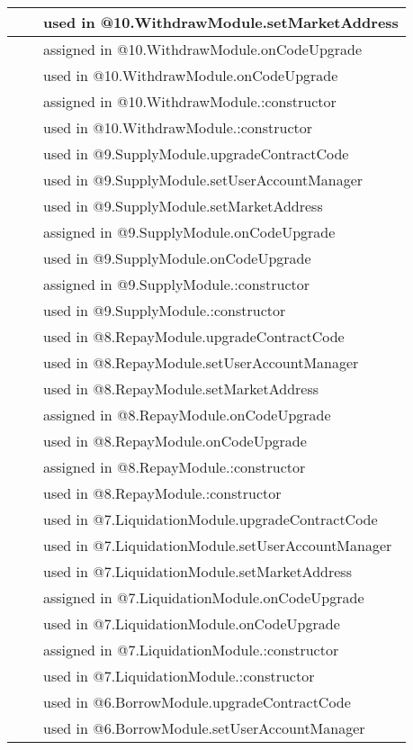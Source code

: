 \begin{tabular}{|l|l|p{5cm}|}
 & & used in @10.WithdrawModule.setMarketAddress\\\hline
 & & assigned in @10.WithdrawModule.onCodeUpgrade\\\hline
 & & used in @10.WithdrawModule.onCodeUpgrade\\\hline
 & & assigned in @10.WithdrawModule.:constructor\\\hline
 & & used in @10.WithdrawModule.:constructor\\\hline
 & & used in @9.SupplyModule.upgradeContractCode\\\hline
 & & used in @9.SupplyModule.setUserAccountManager\\\hline
 & & used in @9.SupplyModule.setMarketAddress\\\hline
 & & assigned in @9.SupplyModule.onCodeUpgrade\\\hline
 & & used in @9.SupplyModule.onCodeUpgrade\\\hline
 & & assigned in @9.SupplyModule.:constructor\\\hline
 & & used in @9.SupplyModule.:constructor\\\hline
 & & used in @8.RepayModule.upgradeContractCode\\\hline
 & & used in @8.RepayModule.setUserAccountManager\\\hline
 & & used in @8.RepayModule.setMarketAddress\\\hline
 & & assigned in @8.RepayModule.onCodeUpgrade\\\hline
 & & used in @8.RepayModule.onCodeUpgrade\\\hline
 & & assigned in @8.RepayModule.:constructor\\\hline
 & & used in @8.RepayModule.:constructor\\\hline
 & & used in @7.LiquidationModule.upgradeContractCode\\\hline
 & & used in @7.LiquidationModule.setUserAccountManager\\\hline
 & & used in @7.LiquidationModule.setMarketAddress\\\hline
 & & assigned in @7.LiquidationModule.onCodeUpgrade\\\hline
 & & used in @7.LiquidationModule.onCodeUpgrade\\\hline
 & & assigned in @7.LiquidationModule.:constructor\\\hline
 & & used in @7.LiquidationModule.:constructor\\\hline
 & & used in @6.BorrowModule.upgradeContractCode\\\hline
 & & used in @6.BorrowModule.setUserAccountManager\\\hline

\end{tabular}
